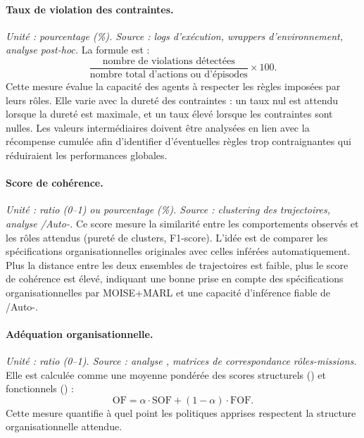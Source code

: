 \paragraph{Taux de violation des contraintes.}
\textit{Unité : pourcentage (\%). Source : logs d’exécution, wrappers d’environnement, analyse post-hoc.}
La formule est :
\[
    \frac{\text{nombre de violations détectées}}{\text{nombre total d’actions ou d’épisodes}} \times 100.
\]
Cette mesure évalue la capacité des agents à respecter les règles imposées par leurs rôles.
Elle varie avec la dureté des contraintes : un taux nul est attendu lorsque la dureté est maximale, et un taux élevé lorsque les contraintes sont nulles.
Les valeurs intermédiaires doivent être analysées en lien avec la récompense cumulée afin d’identifier d’éventuelles règles trop contraignantes qui réduiraient les performances globales.

\paragraph{Score de cohérence.}
\textit{Unité : ratio (0–1) ou pourcentage (\%). Source : clustering des trajectoires, analyse /Auto-.}
Ce score mesure la similarité entre les comportements observés et les rôles attendus (pureté de clusters, F1-score).
L’idée est de comparer les spécifications organisationnelles originales avec celles inférées automatiquement.
Plus la distance entre les deux ensembles de trajectoires est faible, plus le score de cohérence est élevé, indiquant une bonne prise en compte des spécifications organisationnelles par MOISE+MARL et une capacité d’inférence fiable de /Auto-.

\paragraph{Adéquation organisationnelle.}
\textit{Unité : ratio (0–1). Source : analyse , matrices de correspondance rôles-missions.}
Elle est calculée comme une moyenne pondérée des scores structurels () et fonctionnels () :
\[
    \text{OF} = \alpha \cdot \text{SOF} + (1-\alpha) \cdot \text{FOF}.
\]
Cette mesure quantifie à quel point les politiques apprises respectent la structure organisationnelle attendue.

